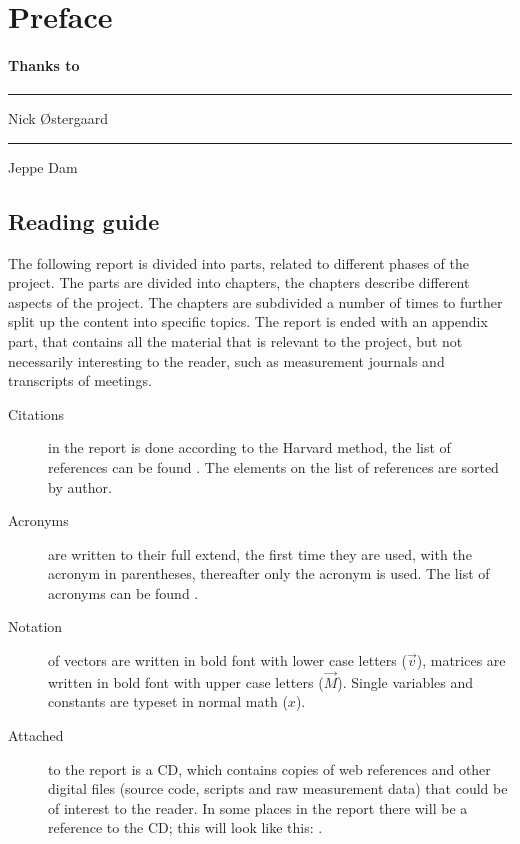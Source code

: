\chapter{Preface}

\subsubsection*{Thanks to}


\begin{center}
  \begin{minipage}[t]{0.47\textwidth}
    \centering \vspace{1.5cm} \hrule \vspace{1mm} Nick \O stergaard
  \end{minipage}
  \hfill
  \begin{minipage}[t]{0.47\textwidth}
    \centering \vspace{1.5cm} \hrule \vspace{1mm} Jeppe Dam
  \end{minipage}
\end{center}


\newpage
\section*{Reading guide}
The following report is divided into parts, related to different phases of the project. The parts are divided into chapters, the chapters describe different aspects of the project. The chapters are subdivided a number of times to further split up the content into specific topics. The report is ended with an appendix part, that contains all the material that is relevant to the project, but not necessarily interesting to the reader, such as measurement journals and transcripts of meetings.

\begin{description}
\item[Citations] in the report is done according to the Harvard method, the list of references can be found . The elements on the list of references are sorted by author.
\item[Acronyms] are written to their full extend, the first time they are used, with the acronym in parentheses, thereafter only the acronym is used. The list of acronyms can be found .
\item[Notation] of vectors are written in bold font with lower case letters ($\vec{v}$), matrices are written in bold font with upper case letters ($\vec{M}$). Single variables and constants are typeset in normal math ($x$).
\item[Attached] to the report is a CD, which contains copies of web references and other digital files (source code, scripts and raw measurement data) that could be of interest to the reader. In some places in the report there will be a reference to the CD; this will look like this: .
\end{description}
